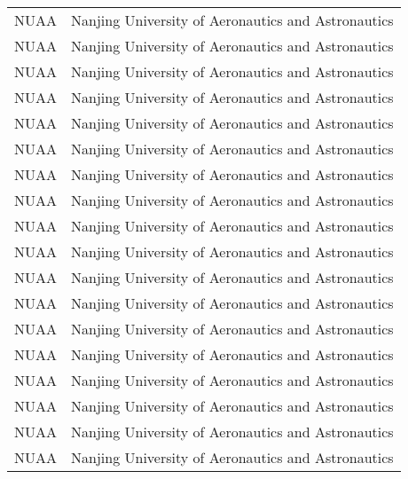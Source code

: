 \begin{longtable}{>{\centering\arraybackslash}p{3cm}>{\centering\arraybackslash}X}
		NUAA	& Nanjing University of Aeronautics and Astronautics \\ 
		NUAA	& Nanjing University of Aeronautics and Astronautics \\ 
		NUAA	& Nanjing University of Aeronautics and Astronautics \\ 
		NUAA	& Nanjing University of Aeronautics and Astronautics \\ 
		NUAA	& Nanjing University of Aeronautics and Astronautics \\ 
		NUAA	& Nanjing University of Aeronautics and Astronautics \\ 
		NUAA	& Nanjing University of Aeronautics and Astronautics \\ 
		NUAA	& Nanjing University of Aeronautics and Astronautics \\ 
		NUAA	& Nanjing University of Aeronautics and Astronautics \\ 
		NUAA	& Nanjing University of Aeronautics and Astronautics \\ 
		NUAA	& Nanjing University of Aeronautics and Astronautics \\ 
		NUAA	& Nanjing University of Aeronautics and Astronautics \\ 
		NUAA	& Nanjing University of Aeronautics and Astronautics \\ 
		NUAA	& Nanjing University of Aeronautics and Astronautics \\ 
		NUAA	& Nanjing University of Aeronautics and Astronautics \\ 	
		NUAA	& Nanjing University of Aeronautics and Astronautics \\ 
		NUAA	& Nanjing University of Aeronautics and Astronautics \\ 
		NUAA	& Nanjing University of Aeronautics and Astronautics \\ 	
	\end{longtable}
